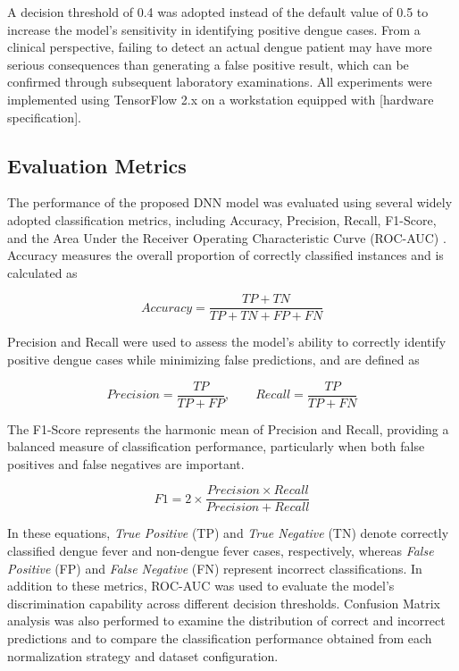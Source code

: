 \documentclass[conference]{IEEEtran}
\begin{document}
A decision threshold of 0.4 was adopted instead of the default value of 0.5 to increase the model's sensitivity in identifying positive dengue cases. From a clinical perspective, failing to detect an actual dengue patient may have more serious consequences than generating a false positive result, which can be confirmed through subsequent laboratory examinations. All experiments were implemented using TensorFlow 2.x on a workstation equipped with [hardware specification].

\subsection{Evaluation Metrics}

The performance of the proposed DNN model was evaluated using several widely adopted classification metrics, including Accuracy, Precision, Recall, F1-Score, and the Area Under the Receiver Operating Characteristic Curve (ROC-AUC) \cite{b34,b35}. Accuracy measures the overall proportion of correctly classified instances and is calculated as

\begin{equation}
Accuracy = \frac{TP + TN}{TP + TN + FP + FN}
\end{equation}

Precision and Recall were used to assess the model's ability to correctly identify positive dengue cases while minimizing false predictions, and are defined as

\begin{equation}
Precision = \frac{TP}{TP + FP}, \qquad
Recall = \frac{TP}{TP + FN}
\end{equation}

The F1-Score represents the harmonic mean of Precision and Recall, providing a balanced measure of classification performance, particularly when both false positives and false negatives are important.

\begin{equation}
F1 = 2 \times \frac{Precision \times Recall}{Precision + Recall}
\end{equation}

In these equations, \textit{True Positive} (TP) and \textit{True Negative} (TN) denote correctly classified dengue fever and non-dengue fever cases, respectively, whereas \textit{False Positive} (FP) and \textit{False Negative} (FN) represent incorrect classifications. In addition to these metrics, ROC-AUC was used to evaluate the model's discrimination capability across different decision thresholds. Confusion Matrix analysis was also performed to examine the distribution of correct and incorrect predictions and to compare the classification performance obtained from each normalization strategy and dataset configuration.
\end{document}
